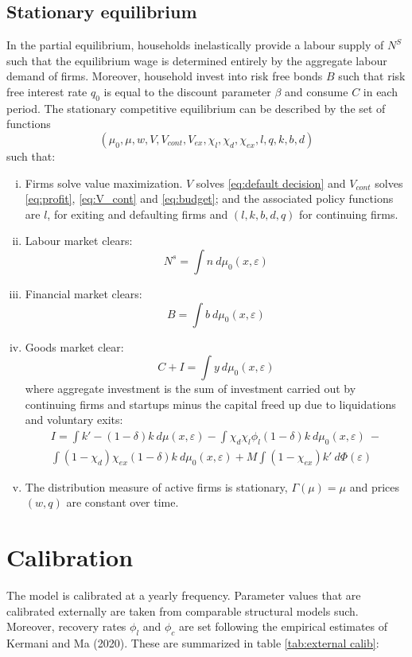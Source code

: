 \documentclass[12pt]{article}
\begin{document}
\subsection{Stationary equilibrium}\label{sec:eq}
In the partial equilibrium, households inelastically provide a labour supply of $N^S$ such that the equilibrium wage is determined entirely by the aggregate labour demand of firms. Moreover, household invest into risk free bonds $B$ such that risk free interest rate $q_0$ is equal to the discount parameter $\beta$ and consume $C$ in each period. The stationary competitive equilibrium can be described by the set of functions
$$(\mu_0, \mu, w, V, V_{cont}, V_{ex}, \chi_l, \chi_d, \chi_{ex}, l,q,k,b,d)$$
such that: 
\begin{enumerate}[(i)]
\item Firms solve value maximization. $V$ solves \ref{eq:default decision} and $V_{cont}$ solves \ref{eq:profit}, \ref{eq:V_cont} and \ref{eq:budget}; and the associated policy functions are $l$, for exiting and defaulting firms and $(l,k,b,d,q)$ for continuing firms.
\item Labour market clears: 
$$ N^s = \int n  \ d \mu_0 (x,\varepsilon)  $$
\item Financial market clears:
 $$ B = \int b \ d \mu_0 (x,\varepsilon) $$
\item Goods market clear: 
$$ C + I = \int y \ d \mu_0 (x,\varepsilon)$$
where aggregate investment is the sum of investment carried out by continuing firms and startups minus the capital freed up due to liquidations and voluntary exits:
\begin{multline*} 
    I = \int   k' -(1-\delta)k \ d \mu (x,\varepsilon) - \int \chi_d \chi_l \phi_l(1-\delta)k \ d \mu_0 (x,\varepsilon) \  - \\
    \int (1-\chi_d)\chi_{ex} (1-\delta) k \ d \mu_0 (x,\varepsilon)  + M \int (1-\chi_{ex}) k' \ d \Phi(\varepsilon) 
\end{multline*}
\item The distribution measure of active firms is stationary, $\Gamma(\mu) = \mu$ and prices $(w,q)$ are constant over time.
\end{enumerate}

\newpage

\section{Calibration}

The model is calibrated at a yearly frequency. Parameter values that are calibrated externally are taken from comparable structural models such. Moreover, recovery rates $\phi_l$ and $\phi_c$ are set following the empirical estimates of Kermani and Ma (2020). These are summarized in table \ref{tab:external calib}: 
\end{document}
